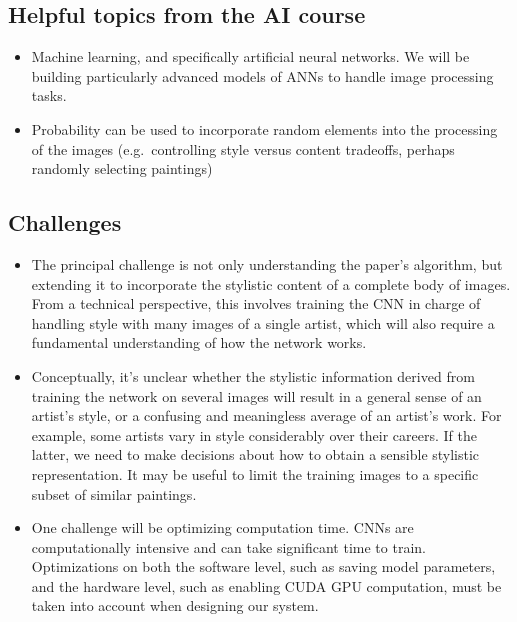 \documentclass[letterpaper,10pt]{article}
\begin{document}
\subsection*{Helpful topics from the AI course}

\begin{itemize}
    \item Machine learning, and specifically artificial neural networks. We will be
    building particularly advanced models of ANNs to handle image processing tasks.
    \item Probability can be used to incorporate random elements into the
      processing of the images (e.g.\ controlling style versus content
      tradeoffs, perhaps randomly selecting paintings)
\end{itemize}

\subsection*{Challenges}

\begin{itemize}
    \item The principal challenge is not only understanding the paper's
      algorithm, but extending it to incorporate the stylistic content of a
      complete body of images. From a technical perspective, this involves
      training the CNN in charge of handling style with many images of a single
      artist, which will also require a fundamental understanding of how the
      network works.
    \item Conceptually, it's unclear whether the stylistic information derived
      from training the network on several images will result in a general
      sense of an artist's style, or a confusing and meaningless average of an
      artist's work. For example, some artists vary in style considerably over
      their careers. If the latter, we need to make decisions about
      how to obtain a sensible stylistic representation. It may be useful to
      limit the training images to a specific subset of similar paintings.
    \item One challenge will be optimizing computation time. CNNs are
      computationally intensive and can take significant time to train.
      Optimizations on both the software level, such as saving model
      parameters, and the hardware level, such as enabling CUDA GPU
      computation, must be taken into account when designing our system.
\end{itemize}


\nocite{*} %

{}
\end{document}
